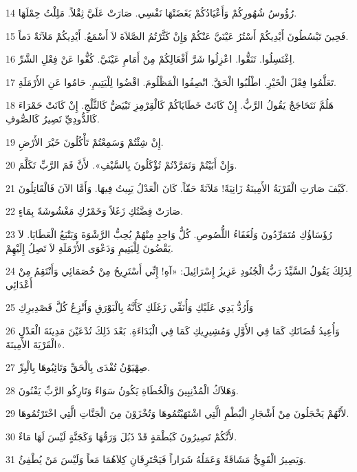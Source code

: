 \par 14 رُؤُوسُ شُهُورِكُمْ وَأَعْيَادُكُمْ بَغَضَتْهَا نَفْسِي. صَارَتْ عَلَيَّ ثِقْلاً. مَلِلْتُ حِمْلَهَا.
\par 15 فَحِينَ تَبْسُطُونَ أَيْدِيكُمْ أَسْتُرُ عَيْنَيَّ عَنْكُمْ وَإِنْ كَثَّرْتُمُ الصَّلاَةَ لاَ أَسْمَعُ. أَيْدِيكُمْ مَلآنَةٌ دَماً.
\par 16 اِغْتَسِلُوا. تَنَقُّوا. اعْزِلُوا شَرَّ أَفْعَالِكُمْ مِنْ أَمَامِ عَيْنَيَّ. كُفُّوا عَنْ فِعْلِ الشَّرِّ.
\par 17 تَعَلَّمُوا فِعْلَ الْخَيْرِ. اطْلُبُوا الْحَقَّ. انْصِفُوا الْمَظْلُومَ. اقْضُوا لِلْيَتِيمِ. حَامُوا عَنِ الأَرْمَلَةِ.
\par 18 هَلُمَّ نَتَحَاجَجْ يَقُولُ الرَّبُّ. إِنْ كَانَتْ خَطَايَاكُمْ كَالْقِرْمِزِ تَبْيَضُّ كَالثَّلْجِ. إِنْ كَانَتْ حَمْرَاءَ كَالدُّودِيِّ تَصِيرُ كَالصُّوفِ.
\par 19 إِنْ شِئْتُمْ وَسَمِعْتُمْ تَأْكُلُونَ خَيْرَ الأَرْضِ.
\par 20 وَإِنْ أَبَيْتُمْ وَتَمَرَّدْتُمْ تُؤْكَلُونَ بِالسَّيْفِ». لأَنَّ فَمَ الرَّبِّ تَكَلَّمَ.
\par 21 كَيْفَ صَارَتِ الْقَرْيَةُ الأَمِينَةُ زَانِيَةً! مَلآنَةً حَقّاً. كَانَ الْعَدْلُ يَبِيتُ فِيهَا. وَأَمَّا الآنَ فَالْقَاتِلُونَ.
\par 22 صَارَتْ فِضَّتُكِ زَغَلاً وَخَمْرُكِ مَغْشُوشَةً بِمَاءٍ.
\par 23 رُؤَسَاؤُكِ مُتَمَرِّدُونَ وَلُغَفَاءُ اللُّصُوصِ. كُلُّ وَاحِدٍ مِنْهُمْ يُحِبُّ الرَّشْوَةَ وَيَتْبَعُ الْعَطَايَا. لاَ يَقْضُونَ لِلْيَتِيمِ وَدَعْوَى الأَرْمَلَةِ لاَ تَصِلُ إِلَيْهِمْ.
\par 24 لِذََلِكَ يَقُولُ السَّيِّدُ رَبُّ الْجُنُودِ عَزِيزُ إِسْرَائِيلَ: «آهِ! إِنِّي أَسْتَرِيحُ مِنْ خُصَمَائِي وَأَنْتَقِمُ مِنْ أَعْدَائِي
\par 25 وَأَرُدُّ يَدِي عَلَيْكِ وَأُنَقِّي زَغَلَكِ كَأَنَّهُ بِالْبَوْرَقِ وَأَنْزِعُ كُلَّ قَصْدِيرِكِ
\par 26 وَأُعِيدُ قُضَاتَكِ كَمَا فِي الأَوَّلِ وَمُشِيرِيكِ كَمَا فِي الْبَدَاءَةِ. بَعْدَ ذَلِكَ تُدْعَيْنَ مَدِينَةَ الْعَدْلِ الْقَرْيَةَ الأَمِينَةَ».
\par 27 صِهْيَوْنُ تُفْدَى بِالْحَقِّ وَتَائِبُوهَا بِالْبِرِّ.
\par 28 وَهَلاَكُ الْمُذْنِبِينَ وَالْخُطَاةِ يَكُونُ سَوَاءً وَتَارِكُو الرَّبِّ يَفْنُونَ.
\par 29 لأَنَّهُمْ يَخْجَلُونَ مِنْ أَشْجَارِ الْبُطْمِ الَّتِي اشْتَهَيْتُمُوهَا وَتُخْزَوْنَ مِنَ الْجَنَّاتِ الَّتِي اخْتَرْتُمُوهَا.
\par 30 لأَنَّكُمْ تَصِيرُونَ كَبُطْمَةٍ قَدْ ذَبُلَ وَرَقُهَا وَكَجَنَّةٍ لَيْسَ لَهَا مَاءٌ.
\par 31 وَيَصِيرُ الْقَوِيُّ مَشَاقَةً وَعَمَلُهُ شَرَاراً فَيَحْتَرِقَانِ كِلاَهُمَا مَعاً وَلَيْسَ مَنْ يُطْفِئُ.

